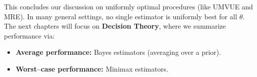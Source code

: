 This concludes our discussion on uniformly optimal procedures (like UMVUE and MRE). In many general settings, no single estimator is uniformly best for all \(\theta\). The next chapters will focus on \textbf{Decision Theory}, where we summarize performance via:
\begin{itemize}
    \item \textbf{Average performance:} Bayes estimators (averaging over a prior).
    \item \textbf{Worst--case performance:} Minimax estimators.
\end{itemize}
